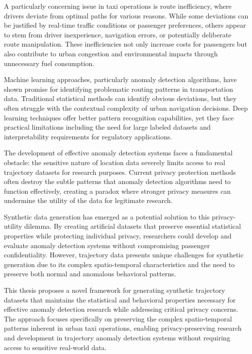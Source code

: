 \documentclass[runningheads]{llncs}
\begin{document}
A particularly concerning issue in taxi operations is route inefficiency, where drivers deviate from optimal paths for various reasons. While some deviations can be justified by real-time traffic conditions or passenger preferences, others appear to stem from driver inexperience, navigation errors, or potentially deliberate route manipulation. These inefficiencies not only increase costs for passengers but also contribute to urban congestion and environmental impacts through unnecessary fuel consumption.

Machine learning approaches, particularly anomaly detection algorithms, have shown promise for identifying problematic routing patterns in transportation data. Traditional statistical methods can identify obvious deviations, but they often struggle with the contextual complexity of urban navigation decisions. Deep learning techniques offer better pattern recognition capabilities, yet they face practical limitations including the need for large labeled datasets and interpretability requirements for regulatory applications.

The development of effective anomaly detection systems faces a fundamental obstacle: the sensitive nature of location data severely limits access to real trajectory datasets for research purposes. Current privacy protection methods often destroy the subtle patterns that anomaly detection algorithms need to function effectively, creating a paradox where stronger privacy measures can undermine the utility of the data for legitimate research.

Synthetic data generation has emerged as a potential solution to this privacy-utility dilemma. By creating artificial datasets that preserve essential statistical properties while protecting individual privacy, researchers could develop and evaluate anomaly detection systems without compromising passenger confidentiality. However, trajectory data presents unique challenges for synthetic generation due to its complex spatio-temporal characteristics and the need to preserve both normal and anomalous behavioral patterns.

This thesis proposes a novel framework for generating synthetic trajectory datasets that maintains the statistical and behavioral properties necessary for effective anomaly detection research while addressing critical privacy concerns. The approach focuses specifically on preserving the complex spatio-temporal patterns inherent in urban taxi operations, enabling privacy-preserving research and development in trajectory anomaly detection systems without requiring access to sensitive real-world data.
\end{document}
